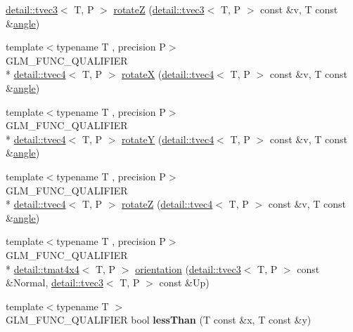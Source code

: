 \begin{DoxyCompactItemize}
\hyperlink{structglm_1_1detail_1_1tvec3}{detail\-::tvec3}$<$ T, P $>$ \hyperlink{group__gtx__rotate__vector_gae5c27548f86f1e95f76a87cf16f512da}{rotate\-Z} (\hyperlink{structglm_1_1detail_1_1tvec3}{detail\-::tvec3}$<$ T, P $>$ const \&v, T const \&\hyperlink{group__gtc__quaternion_ga23a3fc7ada5bbb665ff84c92c6e0542c}{angle})
\item 
{\footnotesize template$<$typename T , precision P$>$ }\\G\-L\-M\-\_\-\-F\-U\-N\-C\-\_\-\-Q\-U\-A\-L\-I\-F\-I\-E\-R \\*
\hyperlink{structglm_1_1detail_1_1tvec4}{detail\-::tvec4}$<$ T, P $>$ \hyperlink{group__gtx__rotate__vector_gaa0db2d8b73f86d7bfdf2bface4056e88}{rotate\-X} (\hyperlink{structglm_1_1detail_1_1tvec4}{detail\-::tvec4}$<$ T, P $>$ const \&v, T const \&\hyperlink{group__gtc__quaternion_ga23a3fc7ada5bbb665ff84c92c6e0542c}{angle})
\item 
{\footnotesize template$<$typename T , precision P$>$ }\\G\-L\-M\-\_\-\-F\-U\-N\-C\-\_\-\-Q\-U\-A\-L\-I\-F\-I\-E\-R \\*
\hyperlink{structglm_1_1detail_1_1tvec4}{detail\-::tvec4}$<$ T, P $>$ \hyperlink{group__gtx__rotate__vector_gae48a26ac0e3670ad2486858bf2a8e90b}{rotate\-Y} (\hyperlink{structglm_1_1detail_1_1tvec4}{detail\-::tvec4}$<$ T, P $>$ const \&v, T const \&\hyperlink{group__gtc__quaternion_ga23a3fc7ada5bbb665ff84c92c6e0542c}{angle})
\item 
{\footnotesize template$<$typename T , precision P$>$ }\\G\-L\-M\-\_\-\-F\-U\-N\-C\-\_\-\-Q\-U\-A\-L\-I\-F\-I\-E\-R \\*
\hyperlink{structglm_1_1detail_1_1tvec4}{detail\-::tvec4}$<$ T, P $>$ \hyperlink{group__gtx__rotate__vector_ga1db5137be16ed5d375038e06707ac52b}{rotate\-Z} (\hyperlink{structglm_1_1detail_1_1tvec4}{detail\-::tvec4}$<$ T, P $>$ const \&v, T const \&\hyperlink{group__gtc__quaternion_ga23a3fc7ada5bbb665ff84c92c6e0542c}{angle})
\item 
{\footnotesize template$<$typename T , precision P$>$ }\\G\-L\-M\-\_\-\-F\-U\-N\-C\-\_\-\-Q\-U\-A\-L\-I\-F\-I\-E\-R \\*
\hyperlink{structglm_1_1detail_1_1tmat4x4}{detail\-::tmat4x4}$<$ T, P $>$ \hyperlink{group__gtx__rotate__vector_gac80aaf3b2af70c7f03f1077d4b6ac507}{orientation} (\hyperlink{structglm_1_1detail_1_1tvec3}{detail\-::tvec3}$<$ T, P $>$ const \&Normal, \hyperlink{structglm_1_1detail_1_1tvec3}{detail\-::tvec3}$<$ T, P $>$ const \&Up)
\item 
\hypertarget{namespaceglm_a6f2a3cef357dbf21b5fc90aded289ba1}{{\footnotesize template$<$typename T $>$ }\\G\-L\-M\-\_\-\-F\-U\-N\-C\-\_\-\-Q\-U\-A\-L\-I\-F\-I\-E\-R bool {\bfseries less\-Than} (T const \&x, T const \&y)}\label{namespaceglm_a6f2a3cef357dbf21b5fc90aded289ba1}


\end{DoxyCompactItemize}
